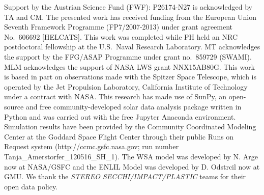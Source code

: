 \documentclass[draft]{agujournal}
\begin{document}









\acknowledgments
Support by the Austrian Science Fund (FWF): P26174-N27 is acknowledged by TA and CM. The presented work has received funding from the European Union Seventh Framework Programme (FP7/2007-2013) under grant agreement No.~606692 [HELCATS]. This work was completed while PH held an NRC postdoctoral fellowship at the U.S.\ Naval Research Laboratory. MT acknowledges the support by the FFG/ASAP Programme under grant no.\ 859729 (SWAMI). MLM acknowledges the support of NASA LWS grant NNX15AB80G. This work is based in part on observations made with the Spitzer Space Telescope, which is operated by the Jet Propulsion Laboratory, California Institute of Technology under a contract with NASA. This research has made use of SunPy, an open-source and free community-developed solar data analysis package written in Python \citep[][]{mum15} and was carried out with the free Jupyter Anaconda environment. Simulation results have been provided by the Community Coordinated Modeling Center at the Goddard Space Flight Center through their public Runs on Request system (http://ccmc.gsfc.nasa.gov; run number Tanja\_Amerstorfer\_120516\_SH\_1). The WSA model was developed by N. Arge now at NASA/GSFC and the ENLIL Model was developed by D. Odstrcil now at GMU. We thank the \textit{STEREO SECCHI/IMPACT/PLASTIC} teams for their open data policy.




\end{document}
